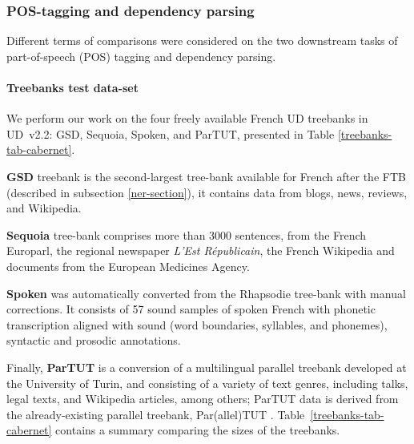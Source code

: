 

\subsubsection{POS-tagging and dependency parsing}




Different terms of comparisons were considered on the two downstream tasks of part-of-speech (POS) tagging and dependency parsing.
\paragraph{Treebanks test data-set}
We perform our work on the four freely available French UD treebanks in UD~v2.2: GSD, Sequoia, Spoken, and ParTUT, presented in Table \ref{treebanks-tab-cabernet}.

\textbf{GSD} treebank \citep{mcdonald-etal-2013-universal} is the second-largest tree-bank available for French after the FTB (described in subsection \ref{ner-section}), it contains data from blogs, news, reviews, and Wikipedia.

\textbf{Sequoia} tree-bank %
\citep{candito-etal-2014-deep} comprises more than 3000 sentences, from the French Europarl, the regional newspaper \emph{L’Est Républicain}, the French Wikipedia and documents from the European Medicines Agency.

\textbf{Spoken} was automatically converted from the Rhapsodie tree-bank  %
\citep{lacheret-etal-2014-rhapsodie} with manual corrections. It consists of 57 sound samples of spoken French with phonetic transcription aligned with sound (word boundaries, syllables, and phonemes), syntactic and prosodic annotations.

Finally, \textbf{ParTUT} is a conversion of a multilingual parallel treebank developed at the University of Turin, and consisting of a variety of text genres, including talks, legal texts, and Wikipedia articles, among others; ParTUT data is derived from the already-existing parallel treebank, Par(allel)TUT \citep{sanguinetti-Bosco-2015-parttut}. Table~\ref{treebanks-tab-cabernet} contains a summary comparing the sizes of the treebanks.%


